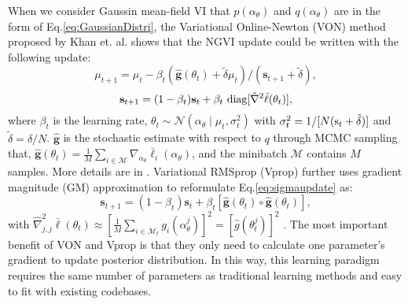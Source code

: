 \documentclass[10pt,twocolumn,letterpaper]{article}
\begin{document}
When we consider Gaussin mean-field VI that $p(\alpha_\theta)$ and $q(\alpha_\theta)$ are in the form of Eq.\eqref{eq:GaussianDistri}, the Variational Online-Newton (VON) method proposed by Khan et. al. \cite{khan2018fast} shows that the NGVI update could be written with the following update:
\begin{equation} \label{eq:muupdate}
\mu_{t+1}=\mu_t-\beta_t(\hat{\textbf{g}}(\theta_t)+\tilde{\delta}\mu_t)/(\textbf{s}_{t+1}+\tilde{\delta}),
\end{equation}
\begin{equation} \label{eq:sigmaupdate}
\textbf{s}_{t+1}=(1-\beta_t)\textbf{s}_t+\beta_t\ \textup{diag}[\hat{\nabla}^2\bar{\ell}(\theta_t)],
\end{equation}
where $\beta_t$ is the learning rate, $\theta_t\sim \mathcal{N}({\alpha_\theta} \mid \mu_t,\sigma_t^2)$ with $\sigma_t^2=1/[N(\textup{s}_t+\tilde{\delta})]$ and $\tilde{\delta}=\delta/N$. $\hat{\textbf{g}}$ is the stochastic estimate with respect to $q$ through MCMC sampling that, $\hat{\mathbf{g}}(\theta_t)=\frac{1}{M}\sum_{i\in \mathcal{M}}\nabla_{\alpha_\theta} \bar{\ell}_i(\alpha_\theta)$, and the minibatch $\mathcal{M}$ contains $M$ samples. More details are in \cite{khan2018fast}. Variational RMSprop (Vprop) \cite{khan2018fast} further uses gradient magnitude (GM) \cite{bottou2018optimization} approximation to reformulate Eq.\eqref{eq:sigmaupdate} as:
\begin{equation} \label{eq:sigmaupdate2}
\textbf{s}_{t+1}=(1-\beta_t)\textbf{s}_t+\beta_t[\hat{\textbf{g}}(\theta_t)\circ \hat{\textbf{g}}(\theta_t)],
\end{equation}
with $\hat{\nabla}^2_{j,j}\bar{\ell}(\theta_t)\approx \left [  \frac{1}{M}\sum_{i\in \mathcal{M}_t}g_i(\alpha_\theta^j)\right ]^2 =[\hat{g}(\theta_t^j)]^2$ \cite{bottou2018optimization}. The most important benefit of VON and Vprop is that they only need to calculate one parameter's gradient to update posterior distribution. In this way, this learning paradigm requires the same number of parameters as traditional learning methods and easy to fit with existing codebases. 
\end{document}
